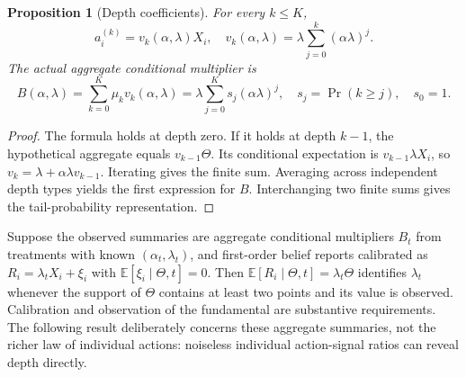 \documentclass[11pt]{article}
\newtheorem{proposition}[theorem]{Proposition}
\theoremstyle{remark}
\newcommand{\E}{\mathbb E}
\begin{document}
\begin{proposition}[Depth coefficients]
For every $k\leq K$,
\[
 a_i^{(k)}=v_k(\alpha,\lambda)X_i,
 \quad v_k(\alpha,\lambda)=\lambda\sum_{j=0}^k(\alpha\lambda)^j.
\]
The actual aggregate conditional multiplier is
\[
 B(\alpha,\lambda)=\sum_{k=0}^K\mu_kv_k(\alpha,\lambda)
 =\lambda\sum_{j=0}^K s_j(\alpha\lambda)^j,
 \quad s_j=\Pr(k\geq j),\quad s_0=1.                      \tag{4}
\]
\end{proposition}
\begin{proof}
The formula holds at depth zero. If it holds at depth $k-1$, the hypothetical aggregate equals $v_{k-1}\Theta$. Its conditional expectation is $v_{k-1}\lambda X_i$, so $v_k=\lambda+\alpha\lambda v_{k-1}$. Iterating gives the finite sum. Averaging across independent depth types yields the first expression for $B$. Interchanging two finite sums gives the tail-probability representation.
\end{proof}

Suppose the observed summaries are aggregate conditional multipliers $B_t$ from treatments with known $(\alpha_t,\lambda_t)$, and first-order belief reports calibrated as
$R_i=\lambda_t X_i+\xi_i$ with $\E[\xi_i\mid\Theta,t]=0$. Then $\E[R_i\mid\Theta,t]=\lambda_t\Theta$ identifies $\lambda_t$ whenever the support of $\Theta$ contains at least two points and its value is observed. Calibration and observation of the fundamental are substantive requirements. The following result deliberately concerns these aggregate summaries, not the richer law of individual actions: noiseless individual action-signal ratios can reveal depth directly.
\end{document}
